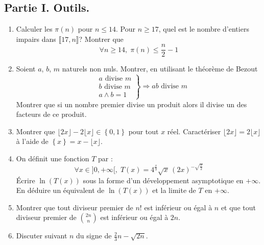 \subsection*{Partie I. Outils.}
\begin{enumerate}
  \item Calculer les $\pi(n)$ pour $n \leq 14$. Pour $n\geq 17$, quel est le nombre d'entiers impairs dans $\llbracket 17, n\rrbracket$? Montrer que 
\begin{displaymath}
  \forall n \geq 14, \; \pi(n) \leq \frac{n}{2} -1
\end{displaymath}

  \item Soient $a$, $b$, $m$ naturels non nuls. Montrer, en utilisant le théorème de Bezout
\begin{displaymath}
  \left. 
\begin{aligned}
  &a \text{ divise } m \\ &b \text{ divise } m  \\ &a\wedge b = 1 
\end{aligned}
\right\rbrace \Rightarrow ab \text{ divise } m  
\end{displaymath}
Montrer que si un nombre premier divise un produit alors il divise un des facteurs de ce produit.
  \item Montrer que $\lfloor 2x\rfloor - 2 \lfloor x \rfloor \in \left\lbrace 0,1 \right\rbrace$ pour tout $x$ réel. Caractériser $\lfloor 2x\rfloor = 2 \lfloor x \rfloor$ à l'aide de $\left\lbrace x\right\rbrace = x - \lfloor x \rfloor$.
       
  \item On définit une fonction $T$ par :
\begin{displaymath}
  \forall x \in ]0,+\infty[, \; T(x) = 4^{\frac{x}{3}}\sqrt{x} \,(2x)^{-\sqrt{\frac{x}{2}}}
\end{displaymath}
\'Ecrire $\ln (T(x))$ sous la forme d'un développement asymptotique en $+\infty$. En déduire un équivalent de $\ln(T(x))$ et la limite de $T$ en $+\infty$. 

  \item Montrer que tout diviseur premier de $n!$ est inférieur ou égal à $n$ et que tout diviseur premier de $\binom{2n}{n}$ est inférieur ou égal à $2n$.
  
  \item Discuter suivant $n$ du signe de $\frac{2}{3}n - \sqrt{2n}$.
  
\end{enumerate}


